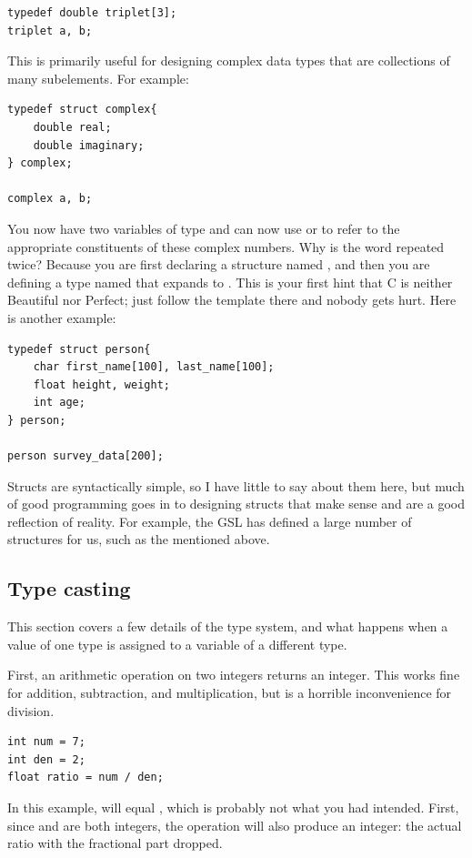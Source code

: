 \documentclass[12pt]{article}
\makeatletter
\def\cindex#1{\index{#1@\ci{#1}}}
\makeatother
\begin{document}
\begin{lstlisting}
typedef double triplet[3];
triplet	a, b;
\end{lstlisting}

This is primarily useful for designing
complex data types that are collections of many subelements. \cindex{struct}
For example:

\begin{lstlisting}
typedef struct complex{
    double real;
    double imaginary;
} complex;

complex a, b;
\end{lstlisting}

You now have two variables of type  and can now use  or  to refer to the appropriate constituents
of these complex numbers. Why is the word  repeated
twice? Because you are first declaring a structure named ,
and then you are defining a type named  that expands to
. This is your first hint that C is neither Beautiful
nor Perfect; just follow the template there and nobody gets hurt. Here is
another example:
\begin{lstlisting}
typedef struct person{
    char first_name[100], last_name[100];
    float height, weight;
    int age;
} person;

person survey_data[200];
\end{lstlisting}

Structs are syntactically simple, so I have little to say about them here,
but much of good programming goes in to designing structs that make sense
and are a good reflection of reality.  For example, the GSL has defined
a large number of structures for us, such as the 
mentioned above.


\subsection{\treesymbol Type casting}\label{casting}   
This section covers a few details of the type system, and what happens
when a value of one type is assigned to a variable of a different type.

First, an arithmetic operation on two integers returns an integer. This works fine for
addition, subtraction, and multiplication, but is a horrible inconvenience for division.\\
\begin{lstlisting}
int num = 7;
int den = 2;
float ratio = num / den;
\end{lstlisting}
In this example,  will equal , which is probably not what you had intended. 
First, since  and  are both integers, the operation
 will also produce an integer: the actual ratio with the
fractional part dropped.
\end{document}
